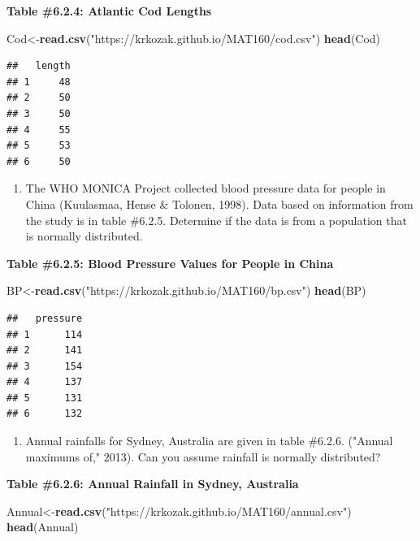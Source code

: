 \documentclass[
]{book}
\newenvironment{Shaded}{\begin{snugshade}}{\end{snugshade}}
\newcommand{\KeywordTok}[1]{\textcolor[rgb]{0.13,0.29,0.53}{\textbf{#1}}}
\newcommand{\NormalTok}[1]{#1}
\newcommand{\StringTok}[1]{\textcolor[rgb]{0.31,0.60,0.02}{#1}}
\providecommand{\tightlist}{%
  \setlength{\itemsep}{0pt}\setlength{\parskip}{0pt}}
\begin{document}
\textbf{Table \#6.2.4: Atlantic Cod Lengths}

\begin{Shaded}
\begin{Highlighting}[]
\NormalTok{Cod<-}\KeywordTok{read.csv}\NormalTok{(}\StringTok{"https://krkozak.github.io/MAT160/cod.csv"}\NormalTok{)}
\KeywordTok{head}\NormalTok{(Cod)}
\end{Highlighting}
\end{Shaded}

\begin{verbatim}
##   length
## 1     48
## 2     50
## 3     50
## 4     55
## 5     53
## 6     50
\end{verbatim}

\begin{enumerate}
\def\labelenumi{\arabic{enumi}.}
\setcounter{enumi}{2}
\tightlist
\item
  The WHO MONICA Project collected blood pressure data for people in China (Kuulasmaa, Hense \& Tolonen, 1998). Data based on information from the study is in table \#6.2.5. Determine if the data is from a population that is normally distributed.
\end{enumerate}

\textbf{Table \#6.2.5: Blood Pressure Values for People in China}

\begin{Shaded}
\begin{Highlighting}[]
\NormalTok{BP<-}\KeywordTok{read.csv}\NormalTok{(}\StringTok{"https://krkozak.github.io/MAT160/bp.csv"}\NormalTok{)}
\KeywordTok{head}\NormalTok{(BP)}
\end{Highlighting}
\end{Shaded}

\begin{verbatim}
##   pressure
## 1      114
## 2      141
## 3      154
## 4      137
## 5      131
## 6      132
\end{verbatim}

\begin{enumerate}
\def\labelenumi{\arabic{enumi}.}
\setcounter{enumi}{3}
\tightlist
\item
  Annual rainfalls for Sydney, Australia are given in table \#6.2.6. ("Annual maximums of," 2013). Can you assume rainfall is normally distributed?
\end{enumerate}

\textbf{Table \#6.2.6: Annual Rainfall in Sydney, Australia}

\begin{Shaded}
\begin{Highlighting}[]
\NormalTok{Annual<-}\KeywordTok{read.csv}\NormalTok{(}\StringTok{"https://krkozak.github.io/MAT160/annual.csv"}\NormalTok{)}
\KeywordTok{head}\NormalTok{(Annual)}
\end{Highlighting}
\end{Shaded}
\end{document}

